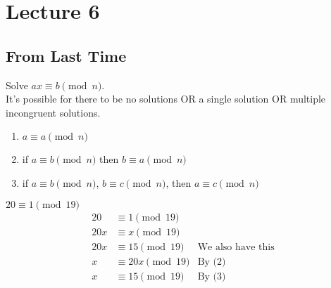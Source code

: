 \chapter{Lecture 6}
\date{September 12, 2024}

\section{From Last Time}
    Solve $ax \equiv b \pmod{n}$. \\
    It's possible for there to be no solutions OR a single solution OR 
    multiple incongruent solutions.
    \begin{theorem}
        \begin{enumerate}
            \item $a\equiv a \pmod{n}$
            \item if $a\equiv b \pmod{n}$ then $b\equiv a \pmod{n}$
            \item if $a\equiv b \pmod{n}$, $b\equiv c \pmod{n}$, then
            $a\equiv c \pmod{n}$
        \end{enumerate}
        \begin{example} $20 \equiv 1 \pmod{19}$
            \begin{align*}
                20 & \equiv 1 \pmod{19} \\
                20x & \equiv x \pmod{19} \\
                20x & \equiv 15 \pmod{19} & \text{We also have this}\\
                x & \equiv 20x \pmod{19} & \text{By (2)} \\
                x & \equiv 15 \pmod{19} & \text{By (3)}
            \end{align*}
        \end{example}
    \end{theorem}

